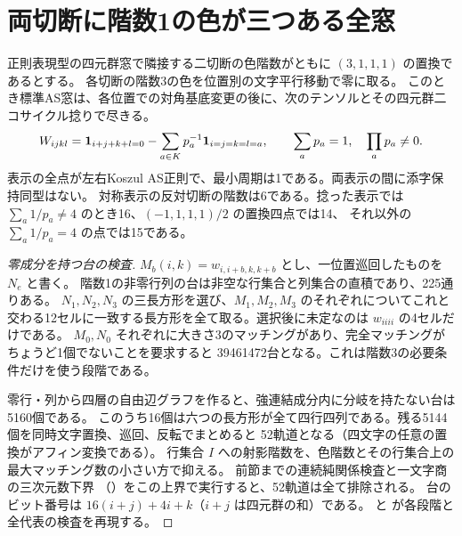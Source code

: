\section{両切断に階数1の色が三つある全窓}
\label{sec:klein-three-lines}
\begin{theorem}\label{thm:klein-three-lines}
正則表現型の四元群窓で隣接する二切断の色階数がともに $(3,1,1,1)$ の置換であるとする。
各切断の階数3の色を位置別の文字平行移動で零に取る。
このとき標準AS窓は、各位置での対角基底変更の後に、次のテンソルとその四元群二コサイクル捻りで尽きる。
\[
 W_{ijkl}={\bf1}_{i+j+k+l=0}
 -\sum_{a\in K}p_a^{-1}{\bf1}_{i=j=k=l=a},
 \qquad \sum_a p_a=1,\quad \prod_a p_a\ne0 .
\]
表示の全点が左右Koszul AS正則で、最小周期は1である。両表示の間に添字保持同型はない。
対称表示の反対切断の階数は6である。捻った表示では
$\sum_a1/p_a\ne4$ のとき16、$(-1,1,1,1)/2$ の置換四点では14、
それ以外の $\sum_a1/p_a=4$ の点では15である。
\end{theorem}
\begin{proof}[零成分を持つ台の検査]
$M_b(i,k)=w_{i,i+b,k,k+b}$ とし、一位置巡回したものを $N_e$ と書く。
階数1の非零行列の台は非空な行集合と列集合の直積であり、225通りある。
$N_1,N_2,N_3$ の三長方形を選び、$M_1,M_2,M_3$ のそれぞれについてこれと
交わる12セルに一致する長方形を全て取る。選択後に未定なのは $w_{iiii}$ の4セルだけである。
$M_0,N_0$ それぞれに大きさ3のマッチングがあり、完全マッチングがちょうど1個でないことを要求すると
39461472台となる。これは階数3の必要条件だけを使う段階である。

零行・列から四層の自由辺グラフを作ると、強連結成分内に分岐を持たない台は5160個である。
このうち16個は六つの長方形が全て四行四列である。残る5144個を同時文字置換、巡回、反転でまとめると
52軌道となる（四文字の任意の置換がアフィン変換である）。
行集合 $I$ への射影階数を、色階数とその行集合上の最大マッチング数の小さい方で抑える。
前節までの連続純関係検査と一文字商の三次元数下界
（）をこの上界で実行すると、52軌道は全て排除される。
台のビット番号は $16(i+j)+4i+k$（$i+j$ は四元群の和）である。
 と
 が各段階と全代表の検査を再現する。
\end{proof}

